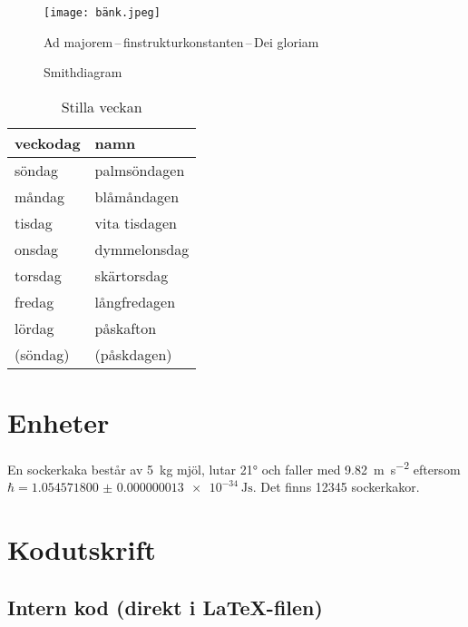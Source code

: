 \documentclass[a4paper, article, oneside, leqno]{memoir}
\begin{document}
\begin{figure}[ht]
  \centering
  \texttt{[image: bänk.jpeg]}
  \caption{Ad majorem\,--\,finstrukturkonstanten\,--\,Dei gloriam}
  \label{fig:bänk}
\end{figure}

\begin{figure}[ht]
  \centering
  
  \caption{Smithdiagram}
  \label{fig:smith}
\end{figure}

\begin{table}[ht]  
  \centering
  \begin{tabular}{ll}
    \toprule
    veckodag & namn \\
    \midrule
    söndag & palmsöndagen \\
    måndag & blåmåndagen \\
    tisdag & vita tisdagen \\
    onsdag & dymmelonsdag \\
    torsdag & skärtorsdag \\
    fredag & långfredagen \\
    lördag & påskafton \\
    (söndag) & (påskdagen) \\
    \bottomrule
  \end{tabular}
  \caption{Stilla veckan}
  \label{tab:stilla}
\end{table}

\chapter{Enheter}


En sockerkaka består av \SI{5}{\kilo\gram} mjöl, lutar \ang{21} och faller med \SI{9,82}{\meter\per\second^2} eftersom \(\hbar = \SI{1.054571800(13)e-34}{\joule\second}\). Det finns \num{12345} sockerkakor.

\appendix
\chapter{Kodutskrift}


\section{Intern kod (direkt i LaTeX-filen)}
\end{document}
